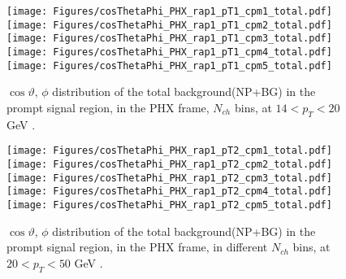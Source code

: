 \documentclass[12pt]{article}
\newcommand{\pt}{$p_{\mathrm{T}}$}
\begin{document}
\begin{figure}[htbp]
\centering
\texttt{[image: Figures/cosThetaPhi\_PHX\_rap1\_pT1\_cpm1\_total.pdf]}
\texttt{[image: Figures/cosThetaPhi\_PHX\_rap1\_pT1\_cpm2\_total.pdf]}
\texttt{[image: Figures/cosThetaPhi\_PHX\_rap1\_pT1\_cpm3\_total.pdf]}
\texttt{[image: Figures/cosThetaPhi\_PHX\_rap1\_pT1\_cpm4\_total.pdf]}
\texttt{[image: Figures/cosThetaPhi\_PHX\_rap1\_pT1\_cpm5\_total.pdf]}
\caption{$\cos\vartheta,\,\phi$ distribution of the total background(NP+BG) in the prompt signal region, 
	in the PHX frame, $N_{ch}$ bins, at $14 < p_{T} < 20$ GeV .}
\end{figure}
\clearpage

\begin{figure}[htbp]
\centering
\texttt{[image: Figures/cosThetaPhi\_PHX\_rap1\_pT2\_cpm1\_total.pdf]}
\texttt{[image: Figures/cosThetaPhi\_PHX\_rap1\_pT2\_cpm2\_total.pdf]}
\texttt{[image: Figures/cosThetaPhi\_PHX\_rap1\_pT2\_cpm3\_total.pdf]}
\texttt{[image: Figures/cosThetaPhi\_PHX\_rap1\_pT2\_cpm4\_total.pdf]}
\texttt{[image: Figures/cosThetaPhi\_PHX\_rap1\_pT2\_cpm5\_total.pdf]}
\caption{$\cos\vartheta,\,\phi$ distribution of the total background(NP+BG) in the prompt signal region, 
	in the PHX frame, in different $N_{ch}$ bins, at $20 < p_{T} < 50$ GeV .}
\end{figure}
\clearpage

\end{document}
